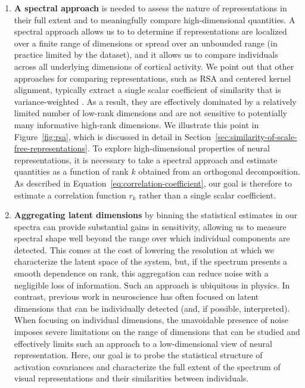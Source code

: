 \documentclass[10pt]{article}
\begin{document}
\begin{enumerate}
    \def\labelenumi{\arabic{enumi}.}
    \tightlist
    \item
          \textbf{A spectral approach} is needed to assess the nature of representations in their full extent and to meaningfully compare high-dimensional quantities. A spectral approach allows us to to determine if representations are localized over a finite range of dimensions or spread over an unbounded range (in practice limited by the dataset), and it allows us to compare individuals across all underlying dimensions of cortical activity. We point out that other approaches for comparing representations, such as RSA and centered kernel alignment, typically extract a single scalar coefficient of similarity that is variance-weighted \autocite{Kriegeskorte2008,Kornblith2019}. As a result, they are effectively dominated by a relatively limited number of low-rank dimensions and are not sensitive to potentially many informative high-rank dimensions. We illustrate this point in Figure~\ref{fig:rsa}, which is discussed in detail in Section~\ref{sec:similarity-of-scale-free-representations}. To explore high-dimensional properties of neural representations, it is necessary to take a spectral approach and estimate quantities as a function of rank \(k\) obtained from an orthogonal decomposition. As described in Equation~\ref{eq:correlation-coefficient}, our goal is therefore to estimate a correlation function \(r_k\) rather than a single scalar coefficient.
    \item
          \textbf{Aggregating latent dimensions} by binning the statistical estimates in our spectra can provide substantial gains in sensitivity, allowing us to measure spectral shape well beyond the range over which individual components are detected. This comes at the cost of lowering the resolution at which we characterize the latent space of the system, but, if the spectrum presents a smooth dependence on rank, this aggregation can reduce noise with a negligible loss of information. Such an approach is ubiquitous in physics. In contrast, previous work in neuroscience has often focused on latent dimensions that can be individually detected (and, if possible, interpreted). When focusing on individual dimensions, the unavoidable presence of noise imposes severe limitations on the range of dimensions that can be studied and effectively limits such an approach to a low-dimensional view of neural representation. Here, our goal is to probe the statistical structure of activation covariances and characterize the full extent of the spectrum of visual representations and their similarities between individuals.
\end{enumerate}
\end{document}
